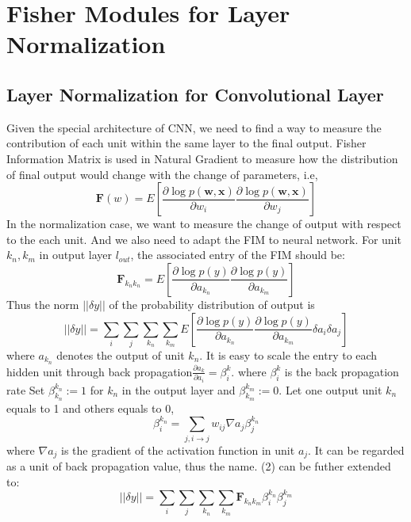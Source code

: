 \documentclass{sig-alternate}
\begin{document}
\section{Fisher Modules for Layer Normalization}
    \subsection{Layer Normalization for Convolutional Layer}
    Given the special architecture of CNN, we need to find a way to measure the contribution of each unit within the same layer to the final output. Fisher Information Matrix is used in Natural Gradient to measure how the distribution of final output would change with the change of parameters, i.e, 
    \begin{displaymath}\pmb{F}(w)=E[\frac{\partial\log p(\pmb{w,x})}{\partial w_i}\frac{\partial\log p(\pmb{w,x})}{\partial w_j}] 
    \end{displaymath}
    In the normalization case, we want to measure the change of output with respect to the each unit. And we also need to adapt the FIM to neural network. For unit $k_n, k_m$ in output layer $l_{out}$, the associated entry of the FIM should be:
    \begin{equation}
        \pmb{F}_{k_nk_n} = E[\frac{\partial\log p(y)}{\partial a_{k_n}}\frac{\partial\log p(y)}{\partial a_{k_m}}]
    \end{equation}
    Thus the norm $||\delta y||$ of the probability distribution of output is 
    \begin{equation}
        ||\delta y|| = \sum_i\sum_j\sum_{k_n}\sum_{k_m}E[\frac{\partial\log p(y)}{\partial a_{k_n}}\frac{\partial\log p(y)}{\partial a_{k_m}}\delta a_i\delta a_j]
    \end{equation}
    where $a_{k_n}$ denotes the output of unit $k_n$.
    It is easy to scale the entry to each hidden unit through back propagation$\frac{\partial a_k}{\partial a_i}=\beta_i^{k}$.
    where $\beta_i^{k}$ is the back propagation rate\cite{LeCun1998}
    Set $\beta_{k_n}^{k_n}:=1$ for $k_n$ in the output layer and $\beta_{k_m}^{k_m}:=0$. Let one output unit $k_n$ equals to 1 and others equals to 0, 
    \begin{equation}
        \beta_{i}^{k_n} = \sum_{j, i\rightarrow j}w_{ij}\nabla a_j \beta_j^{k_n} 
    \end{equation}
    where $\nabla a_j$ is the gradient of the activation function in unit $a_j$. It can be regarded as a unit of back propagation value, thus the name. 
    (2) can be futher extended to:
    \begin{equation}
        ||\delta y|| = \sum_i\sum_j\sum_{k_n}\sum_{k_m}\pmb{F}_{k_nk_m}\beta_i^{k_n}\beta_j^{k_m}
    \end{equation}
\end{document}
